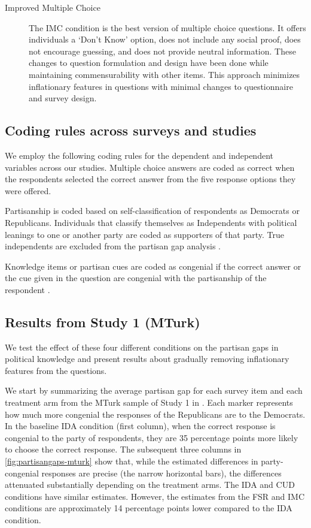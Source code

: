 \documentclass[12pt, letterpaper]{article}
\begin{document}
\begin{description}
  \item[Improved Multiple Choice] \label{txt:IMC} The IMC condition is the best version of multiple choice questions. It offers individuals a `Don't Know' option, does not include any social proof, does not encourage guessing, and does not provide neutral information. These changes to question formulation and design have been done while maintaining commensurability with other items. This approach minimizes inflationary features in questions with minimal changes to questionnaire and survey design.
\end{description}

\subsection*{Coding rules across surveys and studies}


We employ the following coding rules for the dependent and independent variables across our studies. Multiple choice answers are coded as correct when the respondents selected the correct answer from the five response options they were offered.



Partisanship is coded based on self-classification of respondents as Democrats or Republicans. Individuals that classify themselves as Independents with political leanings to one or another party are coded as supporters of that party. True independents are excluded from the partisan gap analysis \citep{Bullock2011, klar2016independent}.

Knowledge items or partisan cues are coded as congenial if the correct answer or the cue given in the question are congenial with the partisanship of the respondent \citep[see][]{prior2015you}.


\subsection*{Results from Study 1 (MTurk)}
We test the effect of these four different conditions on the partisan gaps in political knowledge and present results about gradually removing inflationary features from the questions.

We start by summarizing the average partisan gap for each survey item and each treatment arm from the MTurk sample of Study 1 in . Each marker represents how much more congenial the responses of the Republicans are to the Democrats. 
In the baseline IDA condition (first column), when the correct response is congenial to the party of respondents, they are 35 percentage points more likely to choose the correct response.
The subsequent three columns in \cref{fig:partisangaps-mturk} show that, while the estimated differences in party-congenial responses are precise (the narrow horizontal bars), the differences attenuated substantially depending on the treatment arms. The IDA and CUD conditions have similar estimates.
However, the estimates from the FSR and IMC conditions are approximately 14 percentage points lower compared to the IDA condition.
\end{document}
